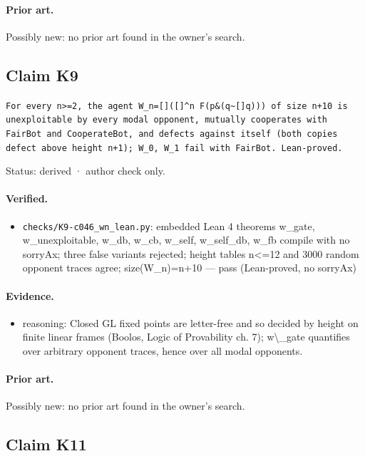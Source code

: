 \documentclass{article}
\begin{document}
\paragraph{Prior art.} Possibly new: no prior art found in the owner's search.

\subsection*{Claim K9}

\texttt{For every n\textgreater{}=2, the agent W\_n=[]([]\textasciicircum{}n F\textbar{}(p\&(q\textbar{}\textasciitilde{}[]q))) of size n+10 is unexploitable by every modal opponent, mutually cooperates with FairBot and CooperateBot, and defects against itself (both copies defect above height n+1); W\_0, W\_1 fail with FairBot. Lean-proved.}

Status: derived · author check only.

\paragraph{Verified.}
\begin{itemize}
\item \texttt{checks/K9-c046\_wn\_lean.py}: embedded Lean 4 theorems w\_gate, w\_unexploitable, w\_db, w\_cb, w\_self, w\_self\_db, w\_fb compile with no sorryAx; three false variants rejected; height tables n\textless{}=12 and 3000 random opponent traces agree; size(W\_n)=n+10 --- pass (Lean-proved, no sorryAx)
\end{itemize}

\paragraph{Evidence.}
\begin{itemize}
\item reasoning: Closed GL fixed points are letter-free and so decided by height on finite linear frames (Boolos, Logic of Provability ch. 7); w\textbackslash{}\_gate quantifies over arbitrary opponent traces, hence over all modal opponents.
\end{itemize}

\paragraph{Prior art.} Possibly new: no prior art found in the owner's search.

\subsection*{Claim K11}
\end{document}
